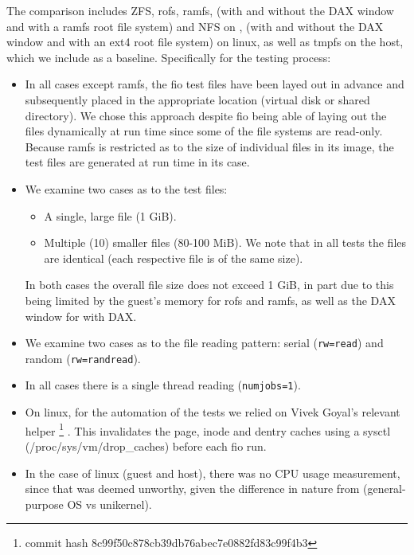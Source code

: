 The comparison includes ZFS, rofs, ramfs, \viofs{} (with and without the DAX
window and with a ramfs root file system) and NFS on \osv{}, \viofs{} (with
and without the DAX window and with an ext4 root file system) on linux, as
well as tmpfs on the host, which we include as a baseline. Specifically for the
testing process:
\begin{itemize}
    \item In all cases except ramfs, the fio test files have been layed out in
          advance and subsequently placed in the appropriate location (virtual
          disk or shared directory). We chose this approach despite fio being
          able of laying out the files dynamically at run time since some of the
          file systems are read-only. Because ramfs is restricted as to the size
          of individual files in its image, the test files are generated at run
          time in its case.
    \item We examine two cases as to the test files:
          \begin{itemize}
              \item A single, large file (1 GiB).
              \item Multiple (10) smaller files (80-100 MiB). We note that in
                    all tests the files are identical (each respective file is
                    of the same size).
          \end{itemize}
          In both cases the overall file size does not exceed 1 GiB, in part due
          to this being limited by the guest's memory for rofs and ramfs, as
          well as the DAX window for \viofs{} with DAX.
    \item We examine two cases as to the file reading pattern: serial
          (\texttt{rw=read}) and random (\texttt{rw=randread}). %
    \item In all cases there is a single thread reading (\texttt{numjobs=1}).
    \item On linux, for the automation of the tests we relied on Vivek
          Goyal's relevant helper%
          \footnote{commit hash 8c99f50c878cb39db76abec7e0882fd83c99f4b3}
          \cite{virtiofs-tests}. This invalidates the page, inode and dentry
          caches using a sysctl (/proc/sys/vm/drop\_caches) %
          before each fio run.
    \item In the case of linux (guest and host), there was no CPU usage
          measurement, since that was deemed unworthy, given the difference in
          nature from \osv{} (general-purpose OS vs unikernel).
\end{itemize}

